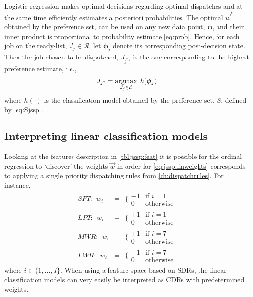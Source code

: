 \documentclass[smallextended]{svjour3}
\renewcommand{\vphi}{\bm \phi}
\begin{document}
	Logistic regression makes optimal decisions regarding optimal dispatches and at the same time efficiently estimates a posteriori probabilities. The optimal $\vec{w}^*$ obtained by the preference set, can be used on any new data point, $\vphi$, and their inner product is proportional to probability estimate \cref{eq:prob}. Hence, for each job on the ready-list, $J_j\in\mathcal{R}$, let $\vphi_j$ denote its corresponding  post-decision state. Then the job chosen to be dispatched, $J_{j^*}$, is the one corresponding to the highest preference estimate, i.e.,
	\begin{equation}\label{eq:lin}
	J_{j^*}=\argmax_{J_j\in \mathcal{L}}\; h(\vphi_j)
	\end{equation}
	where $h(\cdot)$ is the classification model obtained by the preference set, $S$, defined by \eqref{eq:Sjssp}. 
	
	\subsection{Interpreting linear classification models}\label{sec:learningmodels:interpret}
	Looking at the features description in \cref{tbl:jssp:feat} it is possible for the ordinal regression to `discover' the weights $\vec{w}$ in order for \eqref{eq:jssp:linweights} corresponds to applying a single priority dispatching rules from \cref{ch:dispatchrules}. For instance, 
	\begin{eqnarray*} %
	SPT:~~w_i&=&\bigg\{ \begin{array}{rl}-1&\text{if }i=1\\0&\text{otherwise}\end{array} \\
	LPT:~~w_i&=&\bigg\{ \begin{array}{rl}+1&\text{if }i=1\\0&\text{otherwise}\end{array} \\
	MWR:~~w_i&=&\bigg\{ \begin{array}{rl}+1&\text{if }i=7\\0&\text{otherwise}\end{array} \\
	LWR:~~w_i&=&\bigg\{ \begin{array}{rl}-1&\text{if }i=7\\0&\text{otherwise}\end{array}
	\end{eqnarray*}
	where $i\in\{1,\ldots,d\}$. %
	When using a feature space based on SDRs, the linear classification models can very easily be interpreted as CDRs with predetermined weights.
	
\end{document}
